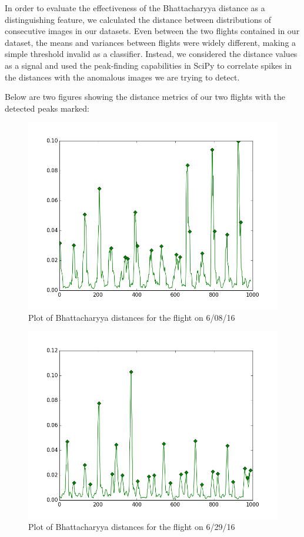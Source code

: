 In order to evaluate the effectiveness of the Bhattacharyya distance as a distinguishing feature, we calculated the distance between distributions of consecutive images in our datasets.
Even between the two flights contained in our dataset, the means and variances between flights were widely different, making a simple threshold invalid as a classifier.
Instead, we considered the distance values as a signal and used the peak-finding capabilities in SciPy to correlate spikes in the distances with the anomalous images we are trying to detect.

Below are two figures showing the distance metrics of our two flights with the detected peaks marked:

\begin{figure}[h]
\centering
\includegraphics[scale=.50]{figures/608pf}
\caption{Plot of Bhattacharyya distances for the flight on 6/08/16}
\label{fig:tamu-fig1}
\end{figure}

\begin{figure}[h]
\centering
\includegraphics[scale=.50]{figures/629pf}
\caption{Plot of Bhattacharyya distances for the flight on 6/29/16}
\label{fig:tamu-fig2}
\end{figure}

